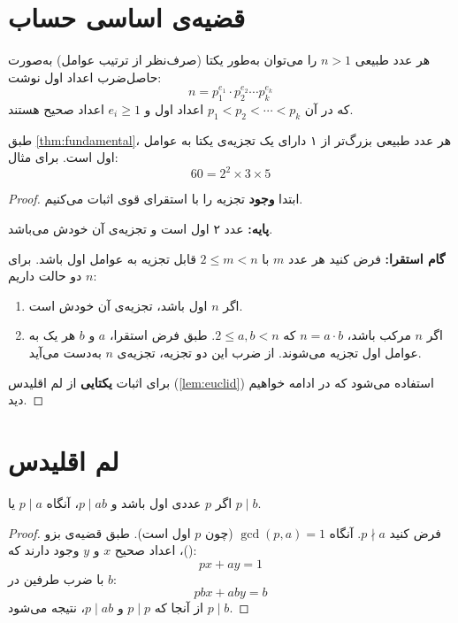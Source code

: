 \documentclass{matinbook}
\begin{document}
\section{قضیه‌ی اساسی حساب}
\label{sec:numbertheory-fundamental}

\begin{theorem}
    هر عدد طبیعی $n > 1$ را می‌توان به‌طور یکتا
    (صرف‌نظر از ترتیب عوامل) به‌صورت حاصل‌ضرب اعداد اول نوشت:
    \[
    n = p_{1}^{e_{1}} \cdot p_{2}^{e_{2}} \cdots p_{k}^{e_{k}}
    \]
    که در آن $p_{1} < p_{2} < \cdots < p_{k}$ اعداد اول
    و $e_{i} \geq 1$ اعداد صحیح هستند.
    \label{thm:fundamental}
\end{theorem}

طبق \cref{thm:fundamental}، هر عدد طبیعی بزرگ‌تر از ۱
دارای یک تجزیه‌ی یکتا به عوامل اول است. برای مثال:
\[
60 = 2^{2} \times 3 \times 5
\]

\begin{proof}
    ابتدا \textbf{وجود} تجزیه را با استقرای قوی اثبات می‌کنیم.

    \textbf{پایه:} عدد ۲ اول است و تجزیه‌ی آن خودش می‌باشد.

    \textbf{گام استقرا:} فرض کنید هر عدد $m$ با $2 \leq m < n$
    قابل تجزیه به عوامل اول باشد. برای $n$ دو حالت داریم:

    \begin{enumerate}
        \item اگر $n$ اول باشد، تجزیه‌ی آن خودش است.
        \item اگر $n$ مرکب باشد، $n = a \cdot b$ که
        $2 \leq a, b < n$. طبق فرض استقرا، $a$ و $b$
        هر یک به عوامل اول تجزیه می‌شوند. از ضرب این دو
        تجزیه، تجزیه‌ی $n$ به‌دست می‌آید.
    \end{enumerate}

    برای اثبات \textbf{یکتایی} از لم اقلیدس
    (\cref{lem:euclid}) استفاده می‌شود که در ادامه
    خواهیم دید.
\end{proof}

\section{لم اقلیدس}
\label{sec:numbertheory-euclid}

\begin{lemma}[لم اقلیدس]
    اگر $p$ عددی اول باشد و $p \mid ab$، آنگاه
    $p \mid a$ یا $p \mid b$.
    \label{lem:euclid}
\end{lemma}

\begin{proof}
    فرض کنید $p \nmid a$. آنگاه $\gcd(p, a) = 1$
    (چون $p$ اول است). طبق قضیه‌ی بزو ()،
    اعداد صحیح $x$ و $y$ وجود دارند که:
    \[
    px + ay = 1
    \]
    با ضرب طرفین در $b$:
    \[
    pbx + aby = b
    \]
    از آنجا که $p \mid p$ و $p \mid ab$، نتیجه می‌شود
    $p \mid b$.
\end{proof}
\end{document}
